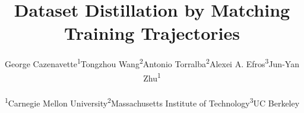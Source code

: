 \documentclass[10pt,twocolumn,letterpaper]{article}
\begin{document}
\title{Dataset Distillation by Matching Training Trajectories}

\author{George Cazenavette\textsuperscript{1}\;\;\;\;\;Tongzhou Wang\textsuperscript{2}\;\;\;\;\;Antonio Torralba\textsuperscript{2}\;\;\;\;\;Alexei A. Efros\textsuperscript{3}\;\;\;\;\;Jun-Yan Zhu\textsuperscript{1}\\
\\
\textsuperscript{1}Carnegie Mellon University\;\;\;\;\;\textsuperscript{2}Massachusetts Institute of Technology\;\;\;\;\;\textsuperscript{3}UC Berkeley
}



\cite{erhan2009visualizing}











{\small


}
\clearpage

\appendix

\end{document}
